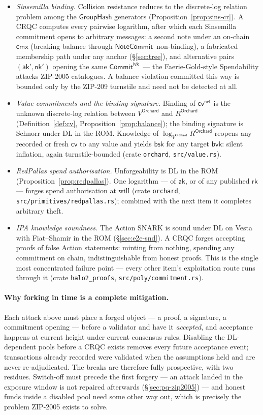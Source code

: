 \documentclass[11pt,a4paper]{article}
\theoremstyle{definition}
\newcommand{\cmx}{\mathsf{cmx}}
\newcommand{\cvsym}{\mathsf{cv}}
\newcommand{\rk}{\mathsf{rk}}
\newcommand{\NoteCommit}{\ensuremath{\mathsf{NoteCommit}}}
\newcommand{\CommitIvk}{\ensuremath{\mathsf{Commit}^{\mathsf{ivk}}}}
\newcommand{\GroupHash}{\ensuremath{\mathsf{GroupHash}}}
\newcommand{\aksym}{\ensuremath{\mathsf{ak}}}
\newcommand{\nksym}{\ensuremath{\mathsf{nk}}}
\begin{document}
\begin{itemize}[leftmargin=*]
\item \emph{Sinsemilla binding.} Collision resistance reduces to the
discrete-log relation problem among the $\GroupHash$ generators
(Proposition~\ref{prop:sins-cr}). A CRQC computes every pairwise logarithm,
after which each Sinsemilla commitment opens to arbitrary messages: a second
note under an on-chain $\cmx$ (breaking balance through
\NoteCommit\ non-binding), a fabricated membership path under any anchor
(\S\ref{sec:tree}), and alternative pairs $(\aksym', \nksym')$ opening the
same \CommitIvk\ --- the Faerie-Gold-style Spendability attacks ZIP-2005
catalogues. A balance violation committed this way is bounded only by the
ZIP-209 turnstile and need not be detected at all.
\item \emph{Value commitments and the binding signature.} Binding of
$\cvsym^{\mathsf{net}}$ is the unknown discrete-log relation between
$V^{\mathsf{Orchard}}$ and $R^{\mathsf{Orchard}}$
(Definition~\ref{def:cv}, Proposition~\ref{prop:balance}); the binding
signature is Schnorr under DL in the ROM. Knowledge of
$\log_{V^{\mathsf{Orchard}}} R^{\mathsf{Orchard}}$ reopens any recorded or
fresh $\cvsym$ to any value and yields $\mathsf{bsk}$ for any target
$\mathsf{bvk}$: silent inflation, again turnstile-bounded (crate
\texttt{orchard}, \texttt{src/value.rs}).
\item \emph{RedPallas spend authorisation.} Unforgeability is DL in the ROM
(Proposition~\ref{prop:redpallas}). One logarithm --- of $\aksym$, or of any
published $\rk$ --- forges spend authorisation at will (crate
\texttt{orchard}, \texttt{src/primitives/redpallas.rs}); combined with the
next item it completes arbitrary theft.
\item \emph{IPA knowledge soundness.} The Action SNARK is sound under DL on
Vesta with Fiat--Shamir in the ROM (\S\ref{sec:e2e-snd}). A CRQC forges
accepting proofs of false Action statements: minting from nothing, spending
any commitment on chain, indistinguishable from honest proofs. This is the
single most concentrated failure point --- every other item's exploitation
route runs through it (crate \texttt{halo2\_proofs},
\texttt{src/poly/commitment.rs}).
\end{itemize}

\paragraph{Why forking in time is a complete mitigation.} Each attack above
must place a forged object --- a proof, a signature, a commitment opening ---
before a validator and have it \emph{accepted}, and acceptance happens at
current height under current consensus rules. Disabling the DL-dependent pools
before a CRQC exists removes every future acceptance event; transactions
already recorded were validated when the assumptions held and are never
re-adjudicated. The breaks are therefore fully prospective, with two residues.
Switch-off must precede the first forgery --- an attack landed in the exposure
window is not repaired afterwards (\S\ref{sec:pq-zip2005}) --- and honest
funds inside a disabled pool need some other way out, which is precisely the
problem ZIP-2005 exists to solve.
\end{document}
